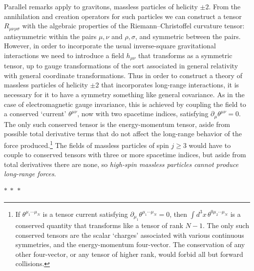 Parallel remarks apply to gravitons, massless particles of helicity $\pm2$.
From the annihilation and creation operators for such particles we can
construct a tensor $R_{\mu\nu\rho\sigma}$ with the algebraic properties of the
Riemann--Christoffel curvature tensor: antisymmetric within the pairs $\mu,\nu$
and $\rho,\sigma$, and symmetric between the pairs. However, in order to
incorporate the usual inverse-square gravitational interactions we need to
introduce a field $h_{\mu\nu}$ that transforms as a symmetric tensor, up to
gauge transformations of the sort associated in general relativity with
general coordinate transformations. Thus in order to construct a theory of
massless particles of helicity $\pm2$ that incorporates long-range
interactions, it is necessary for it to have a symmetry something like general
covariance. As in the case of electromagnetic gauge invariance, this is
achieved by coupling the field to a conserved `current' $\theta^{\mu\nu}$, now
with two spacetime indices, satisfying $\partial_\mu\theta^{\mu\nu}=0$. The
only such conserved tensor is the energy-momentum tensor, aside from possible
total derivative terms that do not affect the long-range behavior of the force
produced.\footnote{If $\theta^{\mu_1\cdots\mu_N}$ is a tensor current
satisfying $\partial_{\mu_1}\theta^{\mu_1\cdots\mu_N}=0$, then
$\int d^3x\,\theta^{0\mu_2\cdots\mu_N}$ is a conserved quantity that
transforms like a tensor of rank $N-1$. The only such conserved tensors are the
scalar `charges' associated with various continuous symmetries, and the
energy-momentum four-vector. The conservation of any other four-vector, or any
tensor of higher rank, would forbid all but forward collisions.} The fields of
massless particles of spin $j\geq3$ would have to couple to conserved tensors
with three or more spacetime indices, but aside from total derivatives there
are none, so \emph{high-spin massless particles cannot produce long-range
forces}.

\begin{center}
$*\ *\ *$
\end{center}

